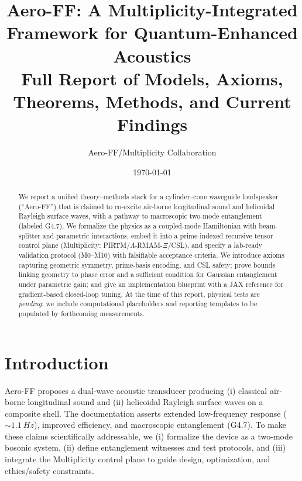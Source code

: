\documentclass[11pt]{article}
\title{Aero-FF: A Multiplicity-Integrated Framework for Quantum-Enhanced Acoustics\\
\large Full Report of Models, Axioms, Theorems, Methods, and Current Findings}
\author{Aero-FF/Multiplicity Collaboration}
\date{\today}
\begin{document}
\maketitle

\begin{abstract}
We report a unified theory--methods stack for a cylinder--cone waveguide loudspeaker (``Aero-FF'') that is claimed to co-excite air-borne longitudinal sound and helicoidal Rayleigh surface waves, with a pathway to macroscopic two-mode entanglement (labeled G4.7). We formalize the physics as a coupled-mode Hamiltonian with beam-splitter and parametric interactions, embed it into a prime-indexed recursive tensor control plane (Multiplicity: PIRTM/\(\Lambda\)-RMAM-\(\Xi\)/CSL), and specify a lab-ready validation protocol (M0--M10) with falsifiable acceptance criteria. We introduce axioms capturing geometric symmetry, prime-basis encoding, and CSL safety; prove bounds linking geometry to phase error and a sufficient condition for Gaussian entanglement under parametric gain; and give an implementation blueprint with a JAX reference for gradient-based closed-loop tuning. At the time of this report, physical tests are \emph{pending}; we include computational placeholders and reporting templates to be populated by forthcoming measurements.
\end{abstract}

\section{Introduction}
Aero-FF proposes a dual-wave acoustic transducer producing (i) classical air-borne longitudinal sound and (ii) helicoidal Rayleigh surface waves on a composite shell. The documentation asserts extended low-frequency response (\(\sim\SI{1.1}{Hz}\)), improved efficiency, and macroscopic entanglement (G4.7). To make these claims scientifically addressable, we (i) formalize the device as a two-mode bosonic system, (ii) define entanglement witnesses and test protocols, and (iii) integrate the Multiplicity control plane to guide design, optimization, and ethics/safety constraints.
\end{document}
